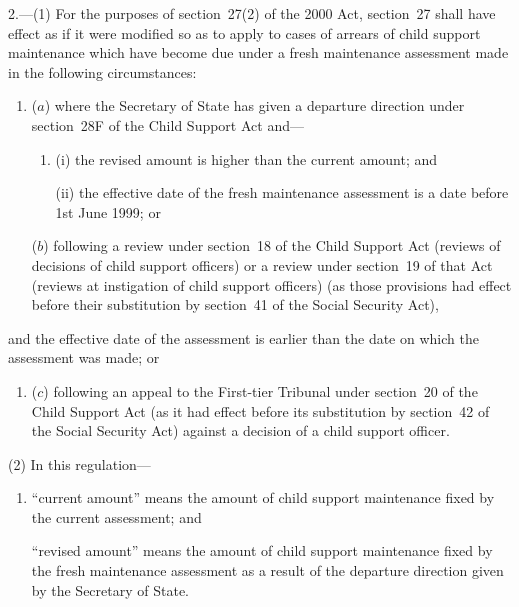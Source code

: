 \documentclass[12pt,a4paper]{article}
\begin{document}
2.---(1)  For the purposes of section~27(2) of the 2000 Act, section~27 shall have effect as if it were modified so as to apply to cases of arrears of child support maintenance which have become due under a fresh maintenance assessment made in the following circumstances:
\begin{enumerate}\item[]
($a$) where the Secretary of State has given a departure direction under section~28F of the Child Support Act and—
\begin{enumerate}\item[]
(i) the revised amount is higher than the current amount; and

(ii) the effective date of the fresh maintenance assessment is a date before 1st June 1999; or
\end{enumerate}

($b$) following a review under section~18 of the Child Support Act (reviews of decisions of child support officers) or a review under section~19 of that Act (reviews at instigation of child support officers) (as those provisions had effect before their substitution by section~41 of the Social Security Act),
\end{enumerate}
and the effective date of the assessment is earlier than the date on which the assessment was made; or
\begin{enumerate}\item[]
($c$) following an appeal to 
the First-tier Tribunal  %
under section~20 of the Child Support Act (as it had effect before its substitution by section~42 of the Social Security Act) against a decision of a child support officer.
\end{enumerate}

(2) In this regulation—
\begin{enumerate}\item[]
“current amount” means the amount of child support maintenance fixed by the current assessment; and

“revised amount” means the amount of child support maintenance fixed by the fresh maintenance assessment as a result of the departure direction given by the Secretary of State.
\end{enumerate}

\end{document}
